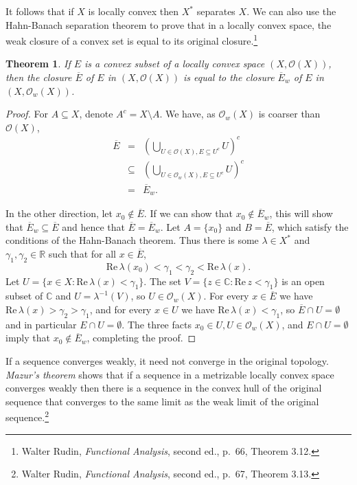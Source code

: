 \documentclass{article}
\def\Re{\ensuremath{\mathrm{Re}}\,}
\newtheorem{theorem}{Theorem}
\begin{document}
It follows that if $X$ is locally convex then $X^*$ separates $X$.
We can also use the Hahn-Banach separation theorem to prove that in a locally
convex space, the weak closure of a convex set is equal to its original closure.\footnote{Walter Rudin, {\em Functional Analysis}, second ed.,
p.~66, Theorem 3.12.}

\begin{theorem}
If $E$ is a convex subset of a locally convex space $(X,\mathcal{O}(X))$, then the closure $\overline{E}$ of $E$
in $(X,\mathcal{O}(X))$ is equal to the closure $\overline{E}_w$ of $E$ in $(X,\mathcal{O}_w(X))$.
\label{weakclosure}
\end{theorem}
\begin{proof}
For $A \subseteq X$, denote $A^c = X \setminus A$. We have, as $\mathcal{O}_w(X)$ is coarser than $\mathcal{O}(X)$,
\begin{eqnarray*}
\overline{E}&=&\left( \bigcup_{U \in \mathcal{O}(X), E \subseteq U^c} U \right)^c\\
&\subseteq&\left( \bigcup_{U \in \mathcal{O}_w(X), E \subseteq U^c} U \right)^c\\
&=&\overline{E}_w.
\end{eqnarray*}

In the other direction, let $x_0 \not \in \overline{E}$. If we can show that $x_0 \not \in \overline{E}_w$,
this will show that $\overline{E}_w \subseteq \overline{E}$ and hence that $\overline{E}=\overline{E}_w$.
Let $A=\{x_0\}$ and $B=\overline{E}$, which satisfy the conditions of the Hahn-Banach theorem. Thus
there is some $\lambda \in X^*$ and $\gamma_1,\gamma_2 \in \mathbb{R}$ such that for all
$x \in \overline{E}$,
\[
\Re \lambda(x_0) < \gamma_1 < \gamma_2 < \Re \lambda(x).
\]
Let $U=\{x \in X: \Re \lambda(x)<\gamma_1\}$.
The set $V=\{z \in \mathbb{C}: \Re z < \gamma_1\}$ is an open subset of $\mathbb{C}$ and $U = \lambda^{-1}(V)$, 
so $U \in \mathcal{O}_w(X)$. For every $x \in \overline{E}$ we have $\Re \lambda(x) > \gamma_2>\gamma_1$, and for every
$x \in U$ we have $\Re \lambda(x)<\gamma_1$, so $\overline{E} \cap U = \emptyset$ and in particular
$E \cap U =\emptyset$. The three facts $x_0 \in U, U \in \mathcal{O}_w(X)$, and $E \cap U=\emptyset$ imply
that $x_0 \not \in \overline{E}_w$, completing the proof.
\end{proof}


If a sequence converges weakly, it  need not converge in the original topology.
{\em Mazur's theorem} shows that if a sequence in a metrizable locally
convex space converges weakly then 
there is a sequence in the convex hull of the original sequence that converges to the same limit as the weak limit of the original sequence.\footnote{Walter Rudin, {\em Functional Analysis}, second ed., p.~67, Theorem 3.13. } 
\end{document}
